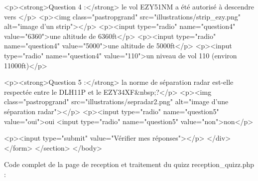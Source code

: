 \documentclass[11pt]{article}
\begin{document}
				\begin{code2}
					<p><strong>Question 4 :</strong> le vol EZY51NM a été autorisé à descendre vers </p>
					<p><img class="pastropgrand" src="illustrations/strip_ezy.png" alt="image d'un strip"></p>
					<p><input type="radio" name="question4" value="6360">une altitude de 6360ft</p>
					<p><input type="radio" name="question4" value="5000">une altitude de 5000ft</p>
					<p><input type="radio" name="question4" value="110">un niveau de vol 110 (environ 11000ft)</p>

					<p><strong>Question 5 :</strong> la norme de séparation radar est-elle respectée entre le DLH11P et le EZY34XF&nbsp;?</p>
					<p><img class="pastropgrand" src="illustrations/sepradar2.png" alt="image d'une séparation radar"></p>
					<p><input type="radio" name="question5" value="oui">oui
						<input type="radio" name="question5" value="non">non</p>

					<p><input type="submit" value="Vérifier mes réponses"></p>
				</div>
			</form>
		</section>
	</body>
\end{code2}

Code complet de la page de reception et traitement du quizz reception\_quizz.php :

\smallskip
\end{document}
